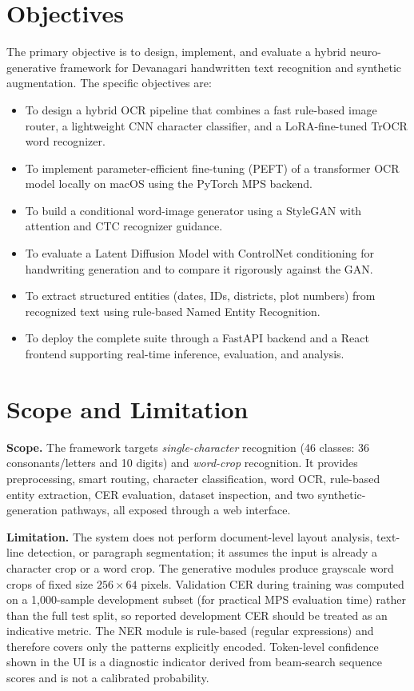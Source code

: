 \documentclass[12pt,a4paper]{report}
\begin{document}
\section{Objectives}
The primary objective is to design, implement, and evaluate a hybrid neuro-generative framework for Devanagari handwritten text recognition and synthetic augmentation. The specific objectives are:
\begin{itemize}[itemsep=2pt]
  \item To design a hybrid OCR pipeline that combines a fast rule-based image router, a lightweight CNN character classifier, and a LoRA-fine-tuned TrOCR word recognizer.
  \item To implement parameter-efficient fine-tuning (PEFT) of a transformer OCR model locally on macOS using the PyTorch MPS backend.
  \item To build a conditional word-image generator using a StyleGAN with attention and CTC recognizer guidance.
  \item To evaluate a Latent Diffusion Model with ControlNet conditioning for handwriting generation and to compare it rigorously against the GAN.
  \item To extract structured entities (dates, IDs, districts, plot numbers) from recognized text using rule-based Named Entity Recognition.
  \item To deploy the complete suite through a FastAPI backend and a React frontend supporting real-time inference, evaluation, and analysis.
\end{itemize}

\section{Scope and Limitation}
\textbf{Scope.} The framework targets \textit{single-character} recognition (46 classes: 36 consonants/letters and 10 digits) and \textit{word-crop} recognition. It provides preprocessing, smart routing, character classification, word OCR, rule-based entity extraction, CER evaluation, dataset inspection, and two synthetic-generation pathways, all exposed through a web interface.

\textbf{Limitation.} The system does not perform document-level layout analysis, text-line detection, or paragraph segmentation; it assumes the input is already a character crop or a word crop. The generative modules produce grayscale word crops of fixed size $256 \times 64$ pixels. Validation CER during training was computed on a 1{,}000-sample development subset (for practical MPS evaluation time) rather than the full test split, so reported development CER should be treated as an indicative metric. The NER module is rule-based (regular expressions) and therefore covers only the patterns explicitly encoded. Token-level confidence shown in the UI is a diagnostic indicator derived from beam-search sequence scores and is not a calibrated probability.
\end{document}
